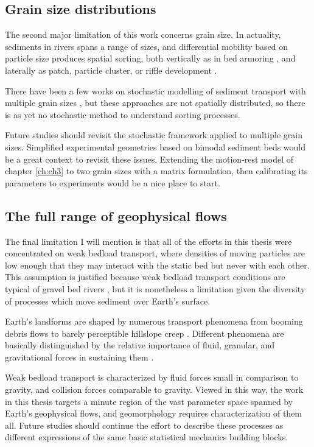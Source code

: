 \subsection{Grain size distributions}

The second major limitation of this work concerns grain size.
In actuality, sediments in rivers spans a range of sizes, and differential mobility based on particle size produces spatial sorting, both vertically as in bed armoring \citep{Parker1982,Wilcock1989,Aberle2006}, and laterally as patch, particle cluster, or riffle development \citep{Nelson2014,Venditti2017}.

There have been a few works on stochastic modelling of sediment transport with multiple grain sizes \citep{Sun2000,Parker2000}, but these approaches are not spatially distributed, so there is as yet no stochastic method to understand sorting processes. 

Future studies should revisit the stochastic framework applied to multiple grain sizes. Simplified experimental geometries based on bimodal sediment beds \citep[e.g.][]{Houssais2012} would be a great context to revisit these issues. Extending the motion-rest model of chapter \ref{ch:ch3} to two grain sizes with a matrix formulation, then calibrating its parameters to experiments would be a nice place to start.

\subsection{The full range of geophysical flows}

The final limitation I will mention is that all of the efforts in this thesis were concentrated on weak bedload transport, where densities of moving particles are low enough that they may interact with the static bed but never with each other. This assumption is justified because weak bedload transport conditions are typical of gravel bed rivers \citep{Ashworth1989,Warburton1992}, but it is nonetheless a limitation given the diversity of processes which move sediment over Earth's surface.

Earth's landforms are shaped by numerous transport phenomena from booming debris flows \citep{Iverson1997} to barely perceptible hillslope creep \citep{Deshpande2021}.
Different phenomena are basically distinguished by the relative importance of fluid, granular, and gravitational forces in sustaining them \citep{Jerolmack2019}.

Weak bedload transport is characterized by fluid forces small in comparison to gravity, and collision forces comparable to gravity.
Viewed in this way, the work in this thesis targets a minute region of the vast parameter space spanned by Earth's geophysical flows, and geomorphology requires characterization of them all.
Future studies should continue the effort \citep{Furbish2021a} to describe these processes as different expressions of the same basic statistical mechanics building blocks.

